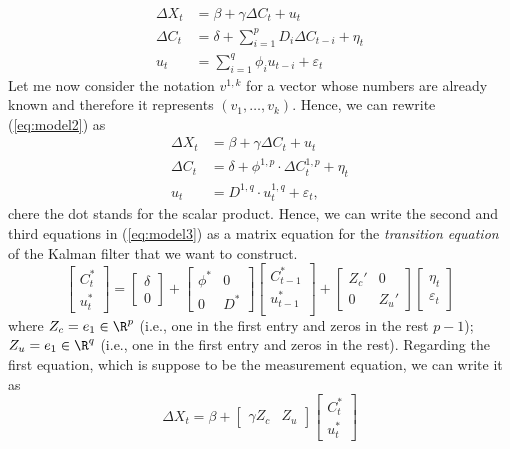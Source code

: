\begin{equation}\label{eq:model2}
	\begin{aligned}
		\Delta X_t &= \beta + \gamma \Delta C_t + u_t \\
		\Delta C_t &= \delta + \sum_{i=1}^p D_i \Delta C_{t-i} + \eta_t\\
		u_t & = \sum_{i=1}^q \phi_i u_{t-i} + \varepsilon_t
	\end{aligned}
\end{equation} 
Let me now consider the notation $v^{1,k}$ for a vector whose numbers are already known and therefore it represents $(v_1,\ldots, v_k)$. Hence, we can rewrite (\ref{eq:model2}) as
\begin{equation}\label{eq:model3}
	\begin{aligned}
		\Delta X_t &= \beta + \gamma \Delta C_t + u_t \\
		\Delta C_t &= \delta + \phi^{1,p}\cdot  \Delta C_{t}^{1,p}+ \eta_t\\
		u_t & = D^{1,q}\cdot u_t^{1,q}+ \varepsilon_t,
	\end{aligned}
\end{equation}
chere the dot stands for the scalar product. Hence, we can write the second and third equations in (\ref{eq:model3}) as a matrix equation for the \emph{transition equation} of the Kalman filter that we want to construct.
\begin{equation}
	\begin{bmatrix}
		C_{t}^\ast  \\ u^\ast_t
	\end{bmatrix}
	=
	\begin{bmatrix}
		\delta \\ 0
	\end{bmatrix}
	+
	\begin{bmatrix}
		\phi^\ast & 0 \\
		0 &D^\ast  
	\end{bmatrix}
	\begin{bmatrix}
		C_{t-1}^\ast \\ u_{t-1}^\ast\\
	\end{bmatrix}
	+
	\begin{bmatrix}
		Z_c' & 0 \\ 0 & Z_u'
	\end{bmatrix}
	\begin{bmatrix}
		\eta_t \\ \varepsilon_t
	\end{bmatrix}
\end{equation}
where $Z_c = e_1\in\R^p$ (i.e., one in the first entry and zeros in the rest $p-1$); $Z_u = e_1\in\R^q$ (i.e., one in the first entry and zeros in the rest). Regarding the first equation, which is suppose to be the measurement equation, we can write it as
\begin{equation}
	\Delta X_t 
	=
	\beta + 
	\begin{bmatrix}
		\gamma Z_c & Z_u 
	\end{bmatrix}
	\begin{bmatrix}
		C_{t}^\ast \\ u_{t}^\ast
	\end{bmatrix}
\end{equation}

